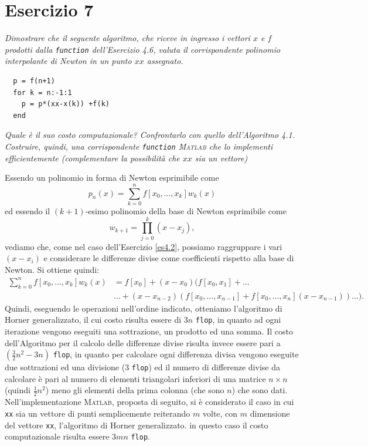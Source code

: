 \section{Esercizio 7}
\label{sub:Esercizio 7}
\emph{Dimostrare che il seguente algoritmo, che riceve in ingresso i vettori $x$ e $f$ prodotti dalla \lstinline{function} dell'Esercizio 4.6, valuta il corrispondente polinomio interpolante di Newton in un punto $xx$
assegnato.}\\
\lstset{language=Matlab}
\begin{lstlisting}
  p = f(n+1)
  for k = n:-1:1
  	p = p*(xx-x(k)) +f(k)
  end
\end{lstlisting}
\emph{Quale è il suo costo computazionale? Confrontarlo con quello dell'Algoritmo 4.1. Costruire, quindi, una corrispondente \lstinline{function} \textsc{Matlab} che lo implementi efficientemente (complementare la possibilità che $xx$ sia un vettore)}
\begin{sol}
	Essendo un polinomio in forma di Newton esprimibile come
	$$p_n(x)=\sum_{k=0}^nf[x_0,\dots,x_k]w_k(x)$$
	ed essendo il $(k+1)$-esimo polinomio della base di Newton esprimibile come
	$$w_{k+1}=\prod_{j=0}^k(x-x_j),$$
	vediamo che, come nel caso dell'Esercizio \ref{es4.2}, possiamo raggruppare i vari $(x-x_i)$ e
	considerare le differenze divise come coefficienti rispetto alla base di Newton. Si ottiene quindi:
	\begin{align*}
		\sum_{k=0}^nf[x_0,\dots,x_k]w_k(x) &= f[x_0] +(x-x_0)(f[x_0,x_1]+\dots\\
		&\dots+(x-x_{n-2})(f[x_0,\dots,x_{n-1}]+f[x_0,\dots,x_n](x-x_{n-1}))\dots).
	\end{align*}
	Quindi, eseguendo le operazioni nell'ordine indicato, otteniamo l'algoritmo di Horner generalizzato,
	il cui costo risulta essere di $3n$ \texttt{flop}, in quanto ad ogni iterazione vengono eseguiti una sottrazione,
	un prodotto ed una somma. Il costo dell'Algoritmo per il calcolo delle differenze divise risulta invece essere pari a
	$(\frac{3}{2}n^2-3n)$ \texttt{flop},
	in quanto per calcolare ogni differenza divisa vengono eseguite due sottrazioni ed una divisione ($3$ \texttt{flop})
	ed il numero di differenze divise da calcolare è pari al numero di elementi triangolari inferiori di una matrice $n\times n$ (quindi $\frac{1}{2}n^2$)
	meno gli elementi della prima colonna (che sono $n$) che sono dati.\\
	Nell'implementazione \textsc{Matlab}, proposta di seguito, si è considerato il caso in cui \lstinline{xx} sia un vettore di punti semplicemente reiterando $m$ volte, con $m$ dimensione del vettore \lstinline{xx}, l'algoritmo di Horner generalizzato. in questo caso il costo computazionale risulta essere $3mn$ \texttt{flop}.
	
\end{sol}

